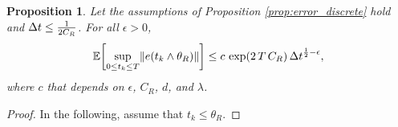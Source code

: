 \documentclass[11pt, twoside]{report}
\newtheorem{proposition}[theorem]{Proposition}
\begin{document}
\begin{proposition}\label{prop:error_under_bounded_ball}
  Let the assumptions of Proposition \ref{prop:error_discrete} hold and ${\Delta t} \leq \frac{1}{2C_R}$.  
    For all $\epsilon>0$, 
    \begin{equation} \label{stopping_hypo}
        \EE\bp{\sup_{0\leq t_k\leq T} \norm{e(t_k\wedge \theta_R)}} \leq  c  \,\exp(2\,T\, C_R)\, \deltat^{\frac12-\epsilon},
    \end{equation}
    where $c$ that depends on $\epsilon$, $C_R$, $d$, and $\lambda$.
\end{proposition}
\begin{proof}
In the following, assume that $t_k \leq \theta_R$. 


\end{proof}
\end{document}
